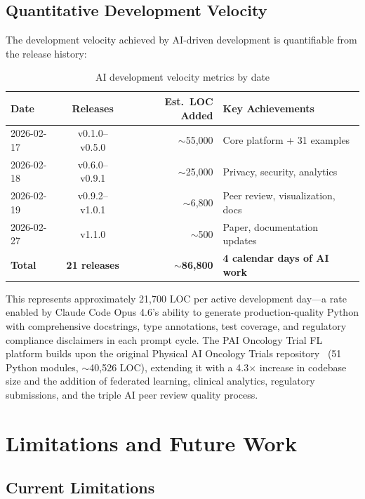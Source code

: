 \subsection{Quantitative Development Velocity}

The development velocity achieved by AI-driven development is quantifiable from the release history:

\begin{table}[H]
\centering
\caption{AI development velocity metrics by date}
\label{tab:velocity}
\small
\begin{tabular}{@{}lcrl@{}}
\toprule
\textbf{Date} & \textbf{Releases} & \textbf{Est.\ LOC Added} & \textbf{Key Achievements} \\
\midrule
2026-02-17 & v0.1.0--v0.5.0 & $\sim$55,000 & Core platform + 31 examples \\
2026-02-18 & v0.6.0--v0.9.1 & $\sim$25,000 & Privacy, security, analytics \\
2026-02-19 & v0.9.2--v1.0.1 & $\sim$6,800 & Peer review, visualization, docs \\
2026-02-27 & v1.1.0 & $\sim$500 & Paper, documentation updates \\
\midrule
\textbf{Total} & \textbf{21 releases} & $\sim$\textbf{86,800} & \textbf{4 calendar days of AI work} \\
\bottomrule
\end{tabular}
\end{table}

This represents approximately 21,700 LOC per active development day---a rate enabled by Claude Code Opus 4.6's ability to generate production-quality Python with comprehensive docstrings, type annotations, test coverage, and regulatory compliance disclaimers in each prompt cycle. The PAI Oncology Trial FL platform builds upon the original Physical AI Oncology Trials repository~\cite{kawchak2026physical} (51 Python modules, $\sim$40,526 LOC), extending it with a 4.3$\times$ increase in codebase size and the addition of federated learning, clinical analytics, regulatory submissions, and the triple AI peer review quality process.

\section{Limitations and Future Work}
\label{sec:limitations}

\subsection{Current Limitations}


